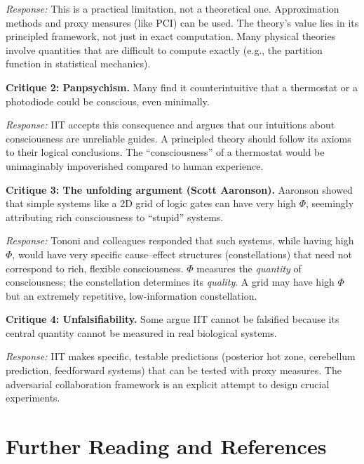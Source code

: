 \documentclass[11pt,a4paper]{report}
\newcommand{\Phi}{\varPhi}
\begin{document}
\emph{Response:} This is a practical limitation, not a theoretical one. Approximation methods and proxy measures (like PCI) can be used. The theory's value lies in its principled framework, not just in exact computation. Many physical theories involve quantities that are difficult to compute exactly (e.g., the partition function in statistical mechanics).

\textbf{Critique 2: Panpsychism.} Many find it counterintuitive that a thermostat or a photodiode could be conscious, even minimally.

\emph{Response:} IIT accepts this consequence and argues that our intuitions about consciousness are unreliable guides. A principled theory should follow its axioms to their logical conclusions. The ``consciousness'' of a thermostat would be unimaginably impoverished compared to human experience.

\textbf{Critique 3: The unfolding argument (Scott Aaronson).} Aaronson showed that simple systems like a 2D grid of logic gates can have very high $\Phi$, seemingly attributing rich consciousness to ``stupid'' systems.

\emph{Response:} Tononi and colleagues responded that such systems, while having high $\Phi$, would have very specific cause--effect structures (constellations) that need not correspond to rich, flexible consciousness. $\Phi$ measures the \emph{quantity} of consciousness; the constellation determines its \emph{quality}. A grid may have high $\Phi$ but an extremely repetitive, low-information constellation.

\textbf{Critique 4: Unfalsifiability.} Some argue IIT cannot be falsified because its central quantity cannot be measured in real biological systems.

\emph{Response:} IIT makes specific, testable predictions (posterior hot zone, cerebellum prediction, feedforward systems) that can be tested with proxy measures. The adversarial collaboration framework is an explicit attempt to design crucial experiments.


\chapter{Further Reading and References}
\end{document}
